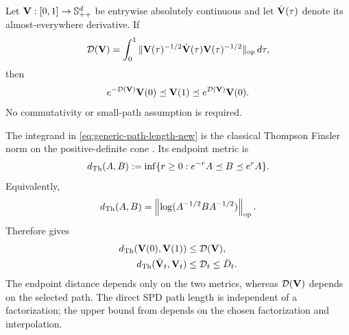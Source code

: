 \begin{lemma}
\label{lem:log-spd-path}
Let $\mathbf{V}:[0,1]\to\mathbb{S}_{++}^d$ be entrywise absolutely continuous and
let $\dot{\mathbf{V}}(\tau)$ denote its almost-everywhere derivative.  If
\begin{equation}\label{eq:generic-path-length-new}
 \mathcal D(\mathbf{V})=\int_0^1
 \|\mathbf{V}(\tau)^{-1/2}\dot{\mathbf{V}}(\tau)\mathbf{V}(\tau)^{-1/2}\|_{\rm op}\,d\tau,
\end{equation}
then
\begin{equation}\label{eq:log-path-sandwich-new}
 e^{-\mathcal D(\mathbf{V})}\mathbf{V}(0)\preceq\mathbf{V}(1)
 \preceq e^{\mathcal D(\mathbf{V})}\mathbf{V}(0).
\end{equation}
No commutativity or small-path assumption is required.
\end{lemma}

\begin{remark}
The integrand in \eqref{eq:generic-path-length-new} is the classical Thompson
Finsler norm on the positive-definite cone
\citep{thompson1963certain,nussbaum1994finsler}.  Its endpoint metric is
\[
 d_{\rm Th}(A,B)
 :=\inf\{r\ge0:e^{-r}A\preceq B\preceq e^rA\}.
\]
Equivalently,
\[
 d_{\rm Th}(A,B)
 =\left\|\log(A^{-1/2}BA^{-1/2})\right\|_{\rm op}.
\]
Therefore  gives
\begin{align*}
 d_{\rm Th}(\mathbf{V}(0),\mathbf{V}(1))&\le\mathcal D(\mathbf{V}),\\
 d_{\rm Th}(\bar{\mathbf{V}}_t,\mathbf{V}_t)&\le\mathcal D_t\le\bar D_t.
\end{align*}
The endpoint distance depends only on the two metrics, whereas
$\mathcal D(\mathbf{V})$ depends on the selected path.  The direct SPD path length is
independent of a factorization; the upper bound from
 depends on the chosen factorization and interpolation.
\end{remark}

